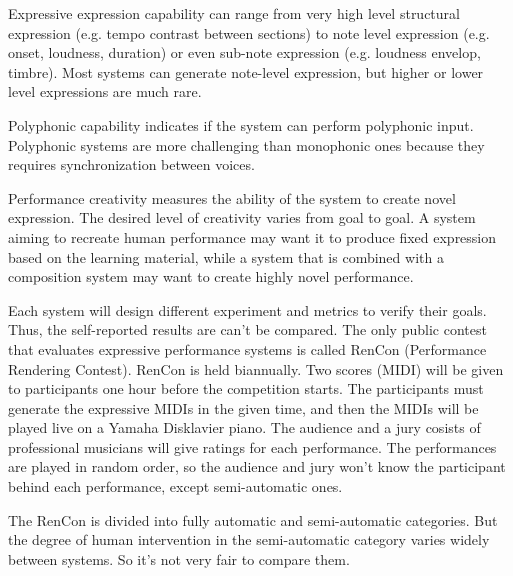Expressive expression capability can range from very high level structural expression (e.g. tempo contrast between sections) to note level expression (e.g. onset, loudness, duration) or even sub-note expression (e.g. loudness envelop, timbre). Most systems can generate note-level expression, but higher or lower level expressions are much rare.

Polyphonic capability indicates if the system can perform polyphonic input. Polyphonic systems are more challenging than monophonic ones because they requires synchronization between voices. 

Performance creativity measures the ability of the system to create novel expression. The desired level of creativity varies from goal to goal. A system aiming to recreate human performance may want it to produce fixed expression based on the learning material, while a system that is combined with a composition system may want to create highly novel performance. 

Each system will design different experiment and metrics to verify their goals. Thus, the self-reported results are can't be compared. The only public contest that evaluates expressive performance systems is called RenCon (Performance Rendering Contest)\cite{rencon}. RenCon is held biannually. Two scores (MIDI) will be given to participants one hour before the competition starts. The participants must generate the expressive MIDIs in the given time, and then the MIDIs will be played live on a Yamaha Disklavier piano. The audience and a jury cosists of professional musicians will give ratings for each performance. The performances are played in random order, so the audience and jury won't know the participant behind each performance, except semi-automatic ones. 

The RenCon is divided into fully automatic and semi-automatic categories. But the degree of human intervention in the semi-automatic category varies widely between systems. So it's not very fair to compare them.





